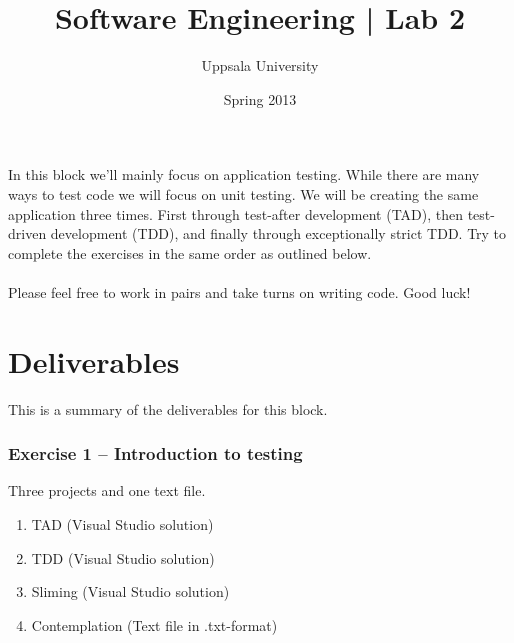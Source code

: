 \documentclass{article}
\begin{document}
  \title{ Software Engineering | Lab 2 }
  \author{ Uppsala University }
  \date{ Spring 2013 }
  \maketitle


    \paragraph{}
      In this block we'll mainly focus on application testing. While there are many ways to test code we will focus on unit testing. We will be creating the same application three times. First through test-after development (TAD), then test-driven development (TDD), and finally through exceptionally strict TDD. Try to complete the exercises in the same order as outlined below.
    \paragraph{}
      Please feel free to work in pairs and take turns on writing code. Good luck!

    \tableofcontents


\pagebreak{}
\section*{Deliverables}
This is a summary of the deliverables for this block.

\subsubsection*{Exercise 1 -- Introduction to testing}
Three projects and one text file.
\begin{enumerate}
  \item TAD (Visual Studio solution)
  \item TDD (Visual Studio solution)
  \item Sliming (Visual Studio solution)
  \item Contemplation (Text file in .txt-format)
\end{enumerate}
\end{document}
